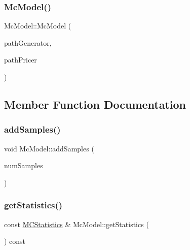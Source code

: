 \subsubsection{\texorpdfstring{Mc\+Model()}{McModel()}}
{\footnotesize\ttfamily Mc\+Model\+::\+Mc\+Model (\begin{DoxyParamCaption}\item[{const std\+::shared\+\_\+ptr$<$ \hyperlink{class_path_generator}{Path\+Generator}$<$ \hyperlink{struct_single_random}{Single\+Random}$<$ \hyperlink{class_normal}{Normal}$<$$>$$>$$>$$>$ \&}]{path\+Generator,  }\item[{const std\+::shared\+\_\+ptr$<$ \hyperlink{class_path_pricer}{Path\+Pricer} $>$}]{path\+Pricer }\end{DoxyParamCaption})}



\subsection{Member Function Documentation}
\hypertarget{class_mc_model_a81f56ed90c002927bdec595eb52c57c3}{}\label{class_mc_model_a81f56ed90c002927bdec595eb52c57c3} 
\subsubsection{\texorpdfstring{add\+Samples()}{addSamples()}}
{\footnotesize\ttfamily void Mc\+Model\+::add\+Samples (\begin{DoxyParamCaption}\item[{unsigned long}]{num\+Samples }\end{DoxyParamCaption})}

\hypertarget{class_mc_model_afc977c490efd468506d7436901a72177}{}\label{class_mc_model_afc977c490efd468506d7436901a72177} 
\subsubsection{\texorpdfstring{get\+Statistics()}{getStatistics()}}
{\footnotesize\ttfamily const \hyperlink{class_m_c_statistics}{M\+C\+Statistics} \& Mc\+Model\+::get\+Statistics (\begin{DoxyParamCaption}{ }\end{DoxyParamCaption}) const}



